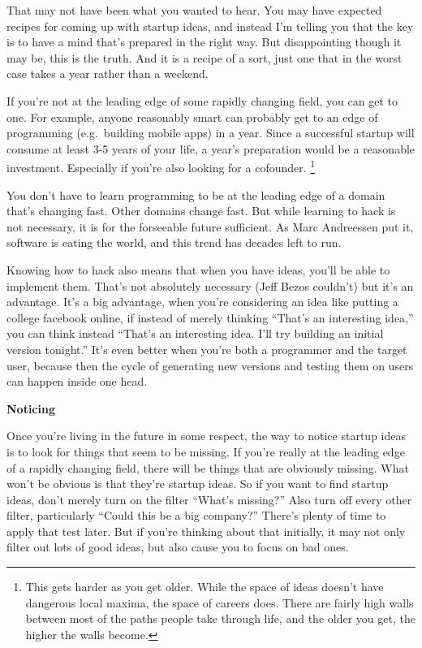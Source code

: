 \documentclass[12pt]{book}
\begin{document}
That may not have been what you wanted to hear. You may have expected
recipes for coming up with startup ideas, and instead I'm telling you
that the key is to have a mind that's prepared in the right way. But
disappointing though it may be, this is the truth. And it is a recipe of
a sort, just one that in the worst case takes a year rather than a
weekend.

If you're not at the leading edge of some rapidly changing field, you
can get to one. For example, anyone reasonably smart can probably get to
an edge of programming (e.g.~building mobile apps) in a year. Since a
successful startup will consume at least 3-5 years of your life, a
year's preparation would be a reasonable investment. Especially if
you're also looking for a cofounder. \footnote{This gets harder as you get older. While the space of ideas
doesn't have dangerous local maxima, the space of careers does. There
are fairly high walls between most of the paths people take through
life, and the older you get, the higher the walls become.}

You don't have to learn programming to be at the leading edge of a
domain that's changing fast. Other domains change fast. But while
learning to hack is not necessary, it is for the forseeable future
sufficient. As Marc Andreessen put it, software is eating the world, and
this trend has decades left to run.

Knowing how to hack also means that when you have ideas, you'll be able
to implement them. That's not absolutely necessary (Jeff Bezos couldn't)
but it's an advantage. It's a big advantage, when you're considering an
idea like putting a college facebook online, if instead of merely
thinking ``That's an interesting idea,'' you can think instead ``That's
an interesting idea. I'll try building an initial version tonight.''
It's even better when you're both a programmer and the target user,
because then the cycle of generating new versions and testing them on
users can happen inside one head.

\textbf{Noticing}

Once you're living in the future in some respect, the way to notice
startup ideas is to look for things that seem to be missing. If you're
really at the leading edge of a rapidly changing field, there will be
things that are obviously missing. What won't be obvious is that they're
startup ideas. So if you want to find startup ideas, don't merely turn
on the filter ``What's missing?'' Also turn off every other filter,
particularly ``Could this be a big company?'' There's plenty of time to
apply that test later. But if you're thinking about that initially, it
may not only filter out lots of good ideas, but also cause you to focus
on bad ones.
\end{document}
